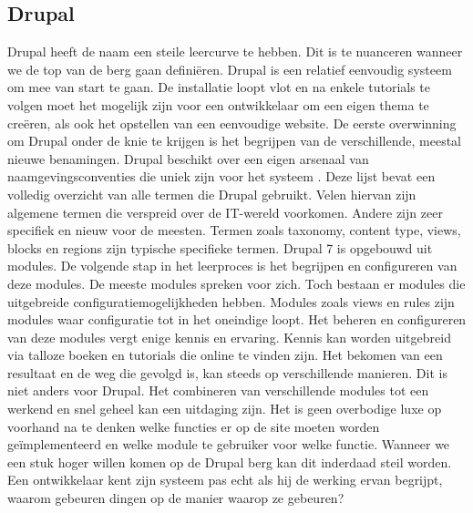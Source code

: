 \subsection{Drupal}
Drupal heeft de naam een steile leercurve te hebben. Dit is te nuanceren wanneer we de top van de berg gaan definiëren. Drupal is een relatief eenvoudig systeem om mee van start te gaan. De installatie loopt vlot en na enkele tutorials te volgen moet het mogelijk zijn voor een ontwikkelaar om een eigen thema te creëren, als ook het opstellen van een eenvoudige website. 
\newline\newline
De eerste overwinning om Drupal onder de knie te krijgen is het begrijpen van de verschillende, meestal nieuwe benamingen. Drupal beschikt over een eigen arsenaal van naamgevingsconventies die uniek zijn voor het systeem \citep{Drupal2016CommunityDocumentationb}. Deze lijst bevat een volledig overzicht van alle termen die Drupal gebruikt. Velen hiervan zijn algemene termen die verspreid over de IT-wereld voorkomen. Andere zijn zeer specifiek en nieuw voor de meesten. Termen zoals taxonomy, content type, views, blocks en regions zijn typische specifieke termen.
\newline\newline
Drupal 7 is opgebouwd uit modules. De volgende stap in het leerproces is het begrijpen en configureren van deze modules. De meeste modules spreken voor zich. Toch bestaan er modules die uitgebreide configuratiemogelijkheden hebben. Modules zoals views en rules zijn modules waar configuratie tot in het oneindige loopt. Het beheren en configureren van deze modules vergt enige kennis en ervaring. Kennis kan worden uitgebreid via talloze boeken en tutorials die online te vinden zijn.
\newline\newline
Het bekomen van een resultaat en de weg die gevolgd is, kan steeds op verschillende manieren. Dit is niet anders voor Drupal. Het combineren van verschillende modules tot een werkend en snel geheel kan een uitdaging zijn. Het is geen overbodige luxe op voorhand na te denken welke functies er op de site moeten worden geïmplementeerd en welke module te gebruiker voor welke functie.
\newline\newline
Wanneer we een stuk hoger willen komen op de Drupal berg kan dit inderdaad steil worden. Een ontwikkelaar kent zijn systeem pas echt als hij de werking ervan begrijpt, waarom gebeuren dingen op de manier waarop ze gebeuren? 
